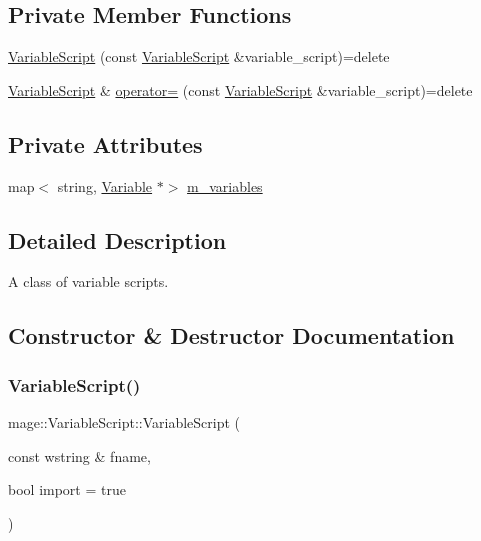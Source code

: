 \subsection*{Private Member Functions}
\begin{DoxyCompactItemize}
\item 
\hyperlink{classmage_1_1_variable_script_aebd4e6cf2bdae4e57c9da428007fc4d7}{Variable\+Script} (const \hyperlink{classmage_1_1_variable_script}{Variable\+Script} \&variable\+\_\+script)=delete
\item 
\hyperlink{classmage_1_1_variable_script}{Variable\+Script} \& \hyperlink{classmage_1_1_variable_script_ae090b066ea939fc6611e77a47df6a97f}{operator=} (const \hyperlink{classmage_1_1_variable_script}{Variable\+Script} \&variable\+\_\+script)=delete
\end{DoxyCompactItemize}
\subsection*{Private Attributes}
\begin{DoxyCompactItemize}
\item 
map$<$ string, \hyperlink{structmage_1_1_variable}{Variable} $\ast$$>$ \hyperlink{classmage_1_1_variable_script_a5cfb006355af91d7d73223a54756898e}{m\+\_\+variables}
\end{DoxyCompactItemize}


\subsection{Detailed Description}
A class of variable scripts. 

\subsection{Constructor \& Destructor Documentation}
\hypertarget{classmage_1_1_variable_script_a4b4028a9710fcfc5fb26bb63922a90cb}{}\label{classmage_1_1_variable_script_a4b4028a9710fcfc5fb26bb63922a90cb} 
\subsubsection{\texorpdfstring{Variable\+Script()}{VariableScript()}\hspace{0.1cm}{\footnotesize\ttfamily [1/2]}}
{\footnotesize\ttfamily mage\+::\+Variable\+Script\+::\+Variable\+Script (\begin{DoxyParamCaption}\item[{const wstring \&}]{fname,  }\item[{bool}]{import = {\ttfamily true} }\end{DoxyParamCaption})}

